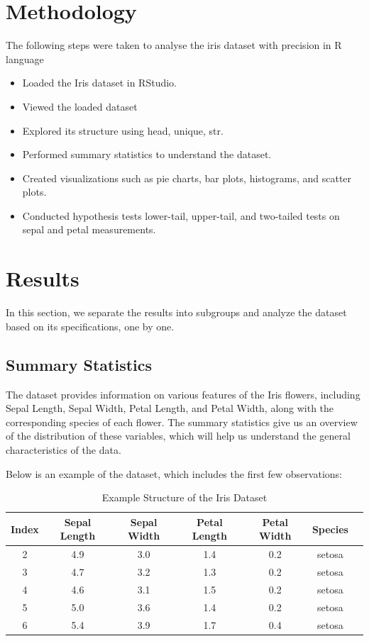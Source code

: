 \documentclass[a4paper,12pt]{article}
\begin{document}
\section{Methodology}
The following steps were taken to analyse the iris dataset with precision in R language
\begin{itemize}
    \item Loaded the Iris dataset in RStudio.
    \item Viewed the loaded dataset 
    \item Explored its structure using head, unique, str.
    \item Performed summary statistics to understand the dataset.
    \item Created visualizations such as pie charts, bar plots, histograms, and scatter plots.
    \item Conducted hypothesis tests lower-tail, upper-tail, and two-tailed tests on sepal and petal measurements.
\end{itemize}

\section{Results}
In this section, we separate the results into subgroups and analyze the dataset based on its specifications, one by one.

\subsection{Summary Statistics}
The dataset provides information on various features of the Iris flowers, including Sepal Length, Sepal Width, Petal Length, and Petal Width, along with the corresponding species of each flower. The summary statistics give us an overview of the distribution of these variables, which will help us understand the general characteristics of the data.

Below is an example of the dataset, which includes the first few observations:

\begin{table}[ht]
    \centering
    \begin{tabular}{|c|c|c|c|c|c|c|} 
    \hline
    \textbf{Index} & \textbf{Sepal Length} & \textbf{Sepal Width} & \textbf{Petal Length} & \textbf{Petal Width} & \textbf{Species} \\ 
    \hline
    2 & 4.9 & 3.0 & 1.4 & 0.2 & setosa \\ 
    3 & 4.7 & 3.2 & 1.3 & 0.2 & setosa \\ 
    4 & 4.6 & 3.1 & 1.5 & 0.2 & setosa \\ 
    5 & 5.0 & 3.6 & 1.4 & 0.2 & setosa \\ 
    6 & 5.4 & 3.9 & 1.7 & 0.4 & setosa \\ 
    \hline 
    \end{tabular} 
    \caption{Example Structure of the Iris Dataset}
\end{table}
\end{document}
